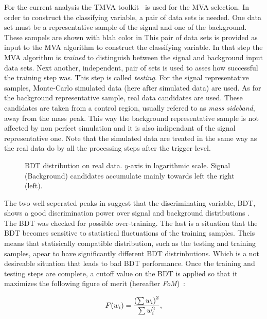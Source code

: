 For the current analysis the TMVA toolkit~\cite{TMVA} is used for the MVA selection. In order to construct the classifying variable,
a pair of data sets is needed. One data set must be a representative sample of the signal and one of the background. {\color{red} These sampels are shown with blah color in }
This pair of data sets is provided as input to the MVA algorithm to construct the classifying variable.
In that step the MVA algorithm is {\it trained} to distinguish between the signal and background input data sets.
Next another, independent, pair of sets is used to asses how successful the training step was. This step is called {\it testing}.
For the signal representative samples, \BsJpsiKst Monte-Carlo simulated data (here after simulated data)
are used. As for the background representative sample, real data candidates are used. These candidates are taken from a control
region, usually refered to as {\it mass sideband}, away from the \BsJpsiKst mass peak. This way the background representative sample
is not affected by non perfect simulation and it is also indipendant of the signal representative one.
Note that the simulated data are treated in the same way as the real data do by all the processing steps after the \lone trigger level.

\begin{figure}[t]
\centering
  \scalebox{1}{}
  \caption{BDT distribution on real data. $y$-axis in logarithmic scale. Signal (Background) candidates accumulate mainly towards left the right (left). }
  \label{BTDG_performance}
\end{figure}

The two well seperated peaks in  suggest that the discriminating variable, BDT, shows a good discrimination
power over signal and background distributions .
The BDT was checked for possible over-training. The last is a situation that the BDT becomes sensitive to statistical fluctuations
of the training samples. Theis means that statisically compatible distribution, such as the testing and training samples,
apear to have significantly different BDT distrinbutions. Which is a not desireable situation that leads to bad BDT performance.
Once the training and testing steps are complete, a cutoff value on the BDT is applied so that it maximizes the following figure of merit
(hereafter {\it FoM})~\cite{Yuehong_fom}:

\begin{equation}
  \centering
  F(w_i) = \frac{\left(\sum{w_{i}}\right)^2}{\sum{w_{i}^2}},
\label{eqn:fom}
\end{equation}

